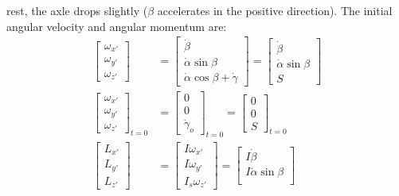 \documentclass[10pt]{article}
\begin{document}
rest, the axle drops slightly ($\beta$ accelerates in the positive 
direction). The initial angular velocity and angular momentum are:
\begin{align*}
    \begin{bmatrix}
        \omega_{x'} \\
        \omega_{y'} \\
        \omega_{z'}
    \end{bmatrix}
    &=
    \begin{bmatrix}
        \dot\beta \\
        \dot\alpha\sin\beta \\
        \dot\alpha\cos\beta + \dot\gamma
    \end{bmatrix}
    =
    \begin{bmatrix}
        \dot\beta \\
        \dot\alpha\sin\beta \\
        S
    \end{bmatrix}
    \\
    \begin{bmatrix}
        \omega_{x'} \\
        \omega_{y'} \\
        \omega_{z'}
    \end{bmatrix}_{t=0}
    &=
    \begin{bmatrix}
        0 \\
        0 \\
        \dot\gamma_o
    \end{bmatrix}_{t=0}
    =
    \begin{bmatrix}
        0 \\
        0 \\
        S
    \end{bmatrix}_{t=0}
    \\
    \begin{bmatrix}
        L_{x'} \\
        L_{y'} \\
        L_{z'}
    \end{bmatrix}
    &=
    \begin{bmatrix}
        I\omega_{x'} \\
        I\omega_{y'} \\
        I_s\omega_{z'}
    \end{bmatrix}
    =
    \begin{bmatrix}
        I\dot\beta \\
        I\dot\alpha\sin\beta \\

\end{bmatrix}
\end{align*}
\end{document}
